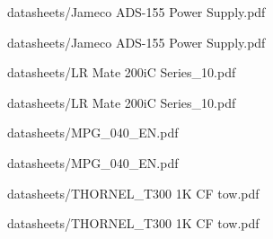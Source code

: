 
            {datasheets/Jameco ADS-155 Power Supply.pdf}


            {datasheets/Jameco ADS-155 Power Supply.pdf}


            {datasheets/LR Mate 200iC Series_10.pdf}


            {datasheets/LR Mate 200iC Series_10.pdf}


            {datasheets/MPG_040_EN.pdf}


            {datasheets/MPG_040_EN.pdf}


            {datasheets/THORNEL_T300 1K CF tow.pdf}


            {datasheets/THORNEL_T300 1K CF tow.pdf}

